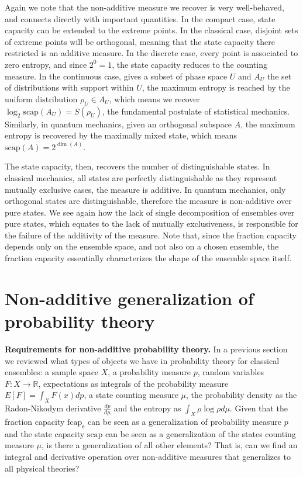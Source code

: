 \documentclass[10pt,twocolumn, nofootinbib]{revtex4-2}
\newcommand\capacity{\mathrm{scap}}
\newcommand\frcap{\mathrm{fcap}}
\newcommand{\ens}[1][e] {\mathsf{#1}} %
\begin{document}
Again we note that the non-additive measure we recover is very well-behaved, and connects directly with important quantities. In the compact case, state capacity can be extended to the extreme points. In the classical case, disjoint sets of extreme points will be orthogonal, meaning that the state capacity there restricted is an additive measure. In the discrete case, every point is associated to zero entropy, and since $2^0=1$, the state capacity reduces to the counting measure. In the continuous case, gives a subset of phase space $U$ and $A_U$ the set of distributions with support within $U$, the maximum entropy is reached by the uniform distribution $\rho_U \in A_U$, which means we recover $\log_2 \capacity(A_U) = S(\rho_U)$, the fundamental postulate of statistical mechanics. Similarly, in quantum mechanics, given an orthogonal subspace $A$, the maximum entropy is recovered by the maximally mixed state, which means $\capacity(A) = 2^{\dim(A)}$.

The state capacity, then, recovers the number of distinguishable states. In classical mechanics, all states are perfectly distinguishable as they represent mutually exclusive cases, the measure is additive. In quantum mechanics, only orthogonal states are distinguishable, therefore the measure is non-additive over pure states. We see again how the lack of single decomposition of ensembles over pure states, which equates to the lack of mutually exclusiveness, is responsible for the failure of the additivity of the measure. Note that, since the fraction capacity depends only on the ensemble space, and not also on a chosen ensemble, the fraction capacity essentially characterizes the shape of the ensemble space itself.

\section{Non-additive generalization of probability theory}

\textbf{Requirements for non-additive probability theory.} In a previous section we reviewed what types of objects we have in probability theory for classical ensembles: a sample space $X$, a probability measure $p$, random variables $F : X \to \mathbb{R}$, expectations as integrals of the probability measure $E[F] = \int_X F(x) dp$, a state counting measure $\mu$, the probability density as the Radon-Nikodym derivative $\frac{dp}{d\mu}$ and the entropy as $\int_X \rho \log \rho d\mu$.  Given that the fraction capacity $\frcap_{\ens}$ can be seen as a generalization of probability measure $p$ and the state capacity $\capacity$ can be seen as a generalization of the states counting measure $\mu$, is there a generalization of all other elements? That is, can we find an integral and derivative operation over non-additive measures that generalizes to all physical theories?
\end{document}
